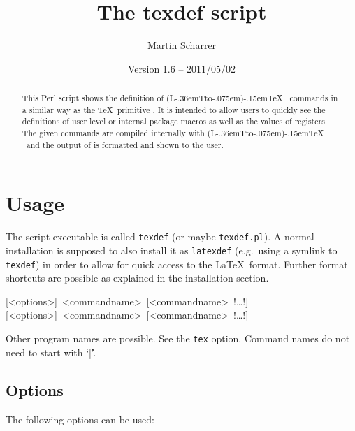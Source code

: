 \documentclass{ydoc}
\title{The \textsf{texdef} script}
\author{Martin Scharrer}
\date{Version 1.6 -- 2011/05/02}
\makeatletter
\DeclareRobustCommand{\LATeX}{%
    (L\kern -.36em{\sbox \z@ T\vbox to\ht \z@ {\hbox {\check@mathfonts \fontsize \sf@size \z@ \math@fontsfalse \selectfont A}\vss }}\kern -.075em)\kern -.15em\TeX
}
\makeatother
\begin{document}
\maketitle

\begin{abstract}
This Perl script shows the definition of \LATeX\ commands in a similar way as the \TeX\ primitive \Macro\show.
It is intended to allow users to quickly see the definitions of user level or internal package macros as well as the
values of registers. The given commands are compiled internally with \LATeX\ and the output of \Macro\show is formatted
and shown to the user.
\end{abstract}

\tableofcontents


\section{Usage}
The script executable is called \texttt{texdef} (or maybe \texttt{texdef.pl}).
A normal installation is supposed to also install it as \texttt{latexdef} (e.g.\ using a symlink to \texttt{texdef}) in order to 
allow for quick access to the \LaTeX\ format. Further format shortcuts are possible as explained in the installation section.

\parindent=0pt
[<options>]~<commandname>~[<commandname>~!\ldots!]
[<options>]~<commandname>~[<commandname>~!\ldots!]

Other program names are possible. See the \texttt{tex} option.  Command names do not need to start with `|\|'.

\subsection*{Options}
The following options can be used:
\par\medskip
\end{document}
